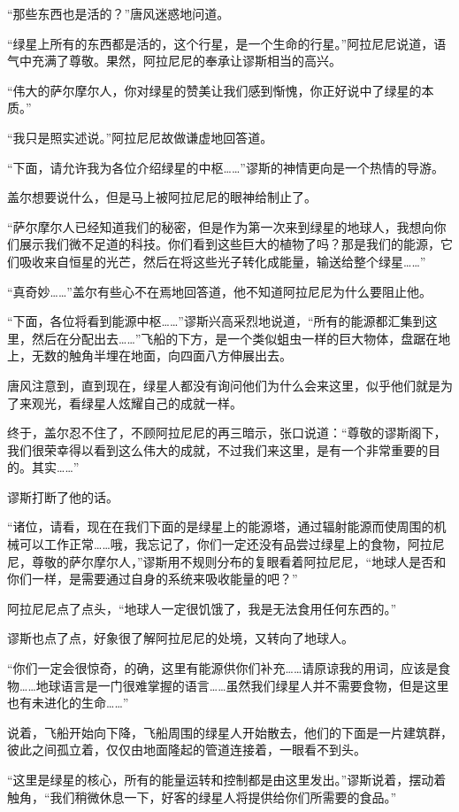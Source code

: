“那些东西也是活的？”唐风迷惑地问道。

“绿星上所有的东西都是活的，这个行星，是一个生命的行星。”阿拉尼尼说道，语气中充满了尊敬。果然，阿拉尼尼的奉承让谬斯相当的高兴。

“伟大的萨尔摩尔人，你对绿星的赞美让我们感到惭愧，你正好说中了绿星的本质。”

“我只是照实述说。”阿拉尼尼故做谦虚地回答道。

“下面，请允许我为各位介绍绿星的中枢……”谬斯的神情更向是一个热情的导游。

盖尔想要说什么，但是马上被阿拉尼尼的眼神给制止了。

“萨尔摩尔人已经知道我们的秘密，但是作为第一次来到绿星的地球人，我想向你们展示我们微不足道的科技。你们看到这些巨大的植物了吗？那是我们的能源，它们吸收来自恒星的光芒，然后在将这些光子转化成能量，输送给整个绿星……”

“真奇妙……”盖尔有些心不在焉地回答道，他不知道阿拉尼尼为什么要阻止他。

“下面，各位将看到能源中枢……”谬斯兴高采烈地说道，“所有的能源都汇集到这里，然后在分配出去……”飞船的下方，是一个类似蛆虫一样的巨大物体，盘踞在地上，无数的触角半埋在地面，向四面八方伸展出去。

唐风注意到，直到现在，绿星人都没有询问他们为什么会来这里，似乎他们就是为了来观光，看绿星人炫耀自己的成就一样。

终于，盖尔忍不住了，不顾阿拉尼尼的再三暗示，张口说道：“尊敬的谬斯阁下，我们很荣幸得以看到这么伟大的成就，不过我们来这里，是有一个非常重要的目的。其实……”

谬斯打断了他的话。

“诸位，请看，现在在我们下面的是绿星上的能源塔，通过辐射能源而使周围的机械可以工作正常……哦，我忘记了，你们一定还没有品尝过绿星上的食物，阿拉尼尼，尊敬的萨尔摩尔人，”谬斯用不规则分布的复眼看着阿拉尼尼，“地球人是否和你们一样，是需要通过自身的系统来吸收能量的吧？”

阿拉尼尼点了点头，“地球人一定很饥饿了，我是无法食用任何东西的。”

谬斯也点了点，好象很了解阿拉尼尼的处境，又转向了地球人。

“你们一定会很惊奇，的确，这里有能源供你们补充……请原谅我的用词，应该是食物……地球语言是一门很难掌握的语言……虽然我们绿星人并不需要食物，但是这里也有未进化的生命……”

说着，飞船开始向下降，飞船周围的绿星人开始散去，他们的下面是一片建筑群，彼此之间孤立着，仅仅由地面隆起的管道连接着，一眼看不到头。

“这里是绿星的核心，所有的能量运转和控制都是由这里发出。”谬斯说着，摆动着触角，“我们稍微休息一下，好客的绿星人将提供给你们所需要的食品。”

